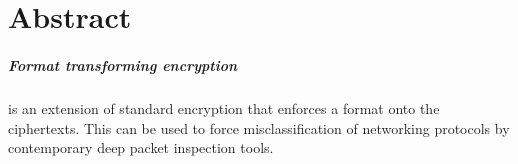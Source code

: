 \documentclass[ %
                    author={Samuel Russell},
                supervisor={Prof. Bogdan Warinschi},
                    degree={MEng},
                     title={Innocuous Ciphertexts},
                  subtitle={The DE-CENSOR Scheme},
                      type={research},
                      year={2018} ]{dissertation}
\begin{document}


\maketitle


\frontmatter


\makedecl


\tableofcontents




\chapter*{Abstract}

\paragraph{Format transforming encryption} is an extension of standard encryption that enforces a format onto the ciphertexts.
This can be used to force misclassification of networking protocols by contemporary deep packet inspection tools.
\end{document}
